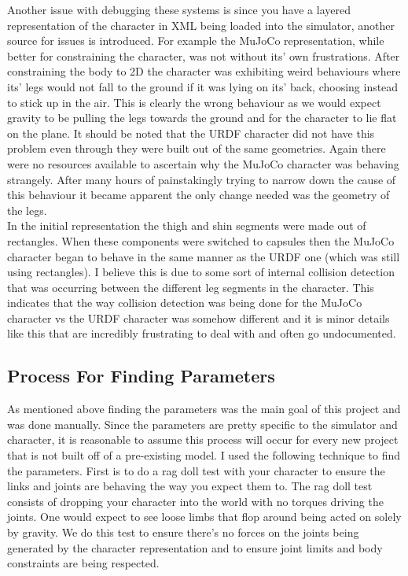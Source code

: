 \documentclass[12pt, a4paper]{article}
\begin{document}
Another issue with debugging these systems is since you have a layered representation of the character in XML being loaded into the simulator, another source for issues is introduced. For example the MuJoCo representation, while better for constraining the character, was not without its' own frustrations. After constraining the body to 2D the character was exhibiting weird behaviours where its' legs would not fall to the ground if it was lying on its' back, choosing instead to stick up in the air.  This is clearly the wrong behaviour as we would expect gravity to be pulling the legs towards the ground and for the character to lie flat on the plane. It should be noted that the URDF character did not have this problem even through they were built out of the same geometries. Again there were no resources available to ascertain why the MuJoCo character was behaving strangely. After many hours of painstakingly trying to narrow down the cause of this behaviour it became apparent the only change needed was the geometry of the legs.\\
 
In the initial representation the thigh and shin segments were made out of rectangles. When these components were switched to capsules then the MuJoCo character began to behave in the same manner as the URDF one (which was still using rectangles). I believe this is due to some sort of internal collision detection that was occurring between the different leg segments in the character. This indicates that the way collision detection was being done for the MuJoCo character vs the URDF character was somehow different and it is minor details like this that are incredibly frustrating to deal with and often go undocumented.  

\subsection{Process For Finding Parameters}
As mentioned above finding the parameters was the main goal of this project and was done manually. Since the parameters are pretty specific to the simulator and character, it is reasonable to assume this process will occur for every new project that is not built off of a pre-existing model. I used the following technique to find the parameters. First is to do a rag doll test with your character to ensure the links and joints are behaving the way you expect them to. The rag doll test consists of dropping your character into the world with no torques driving the joints. One would expect to see loose limbs that flop around being acted on solely by gravity. We do this test to ensure there's no forces on the joints being generated by the character representation and to ensure joint limits and body constraints are being respected.\\
\end{document}
